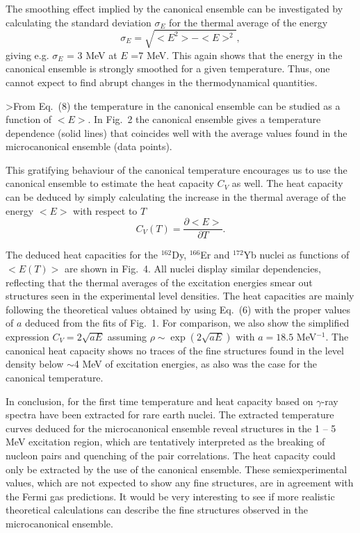 The smoothing effect implied by the canonical ensemble can be investigated
by calculating the standard deviation $\sigma_{\scriptscriptstyle E}$ for
the thermal average of the energy
\begin{equation}
\sigma_{\scriptscriptstyle E}= \sqrt{<E^2>-<E>^2}, \end{equation}
giving e.g. $\sigma_{\scriptscriptstyle E}$ = 3 MeV at $E$ =7 MeV. This
again shows that the energy in the canonical ensemble is strongly smoothed
for a given temperature. Thus, one cannot expect to find abrupt changes in
the thermodynamical quantities.

>From Eq.~(8) the temperature in the canonical ensemble can be studied as a
function of $<E>$. In Fig.~2 the canonical ensemble gives a temperature
dependence (solid lines) that coincides well with the average values found
in the microcanonical ensemble (data points).

This gratifying behaviour of the canonical temperature encourages us to use
the canonical ensemble to estimate the heat capacity $C_V$ as well. The
heat capacity can be deduced by simply calculating the increase in the
thermal average of the energy $<E>$ with respect to $T$ \begin{equation}
C_V(T)=\frac{\partial <E>}{\partial T}.
\end{equation}

The deduced heat capacities for the $^{162}$Dy, $^{166}$Er and $^{172}$Yb
nuclei as functions of $<E(T)>$ are shown in Fig.~4. All nuclei display
similar dependencies, reflecting that the thermal averages of the
excitation energies smear out structures seen in the experimental level
densities. The heat capacities are mainly following the theoretical values
obtained by using Eq.~(6) with the proper values of $a$ deduced from the
fits of Fig.~1. For comparison, we also show the simplified expression
$C_V=2\sqrt{aE}$ assuming $\rho \sim \exp (2 \sqrt{aE})$ with $a =18.5$
MeV$^{-1}$. The canonical heat capacity shows no traces of the fine
structures found in the level density below $\sim$4 MeV of excitation
energies, as also was the case for the canonical temperature.

In conclusion, for the first time temperature and heat capacity based on
$\gamma$-ray spectra have been extracted for rare earth nuclei. The
extracted temperature curves deduced for the microcanonical ensemble reveal
structures in the 1 -- 5 MeV excitation region, which are tentatively
interpreted as the breaking of nucleon pairs and quenching of the pair
correlations. The heat capacity could only be extracted by the use of the
canonical ensemble. These semiexperimental values, which are not expected
to show any fine structures, are in agreement with the Fermi gas
predictions. It would be very interesting to see if more realistic
theoretical calculations can describe the fine structures observed in the
microcanonical ensemble.

